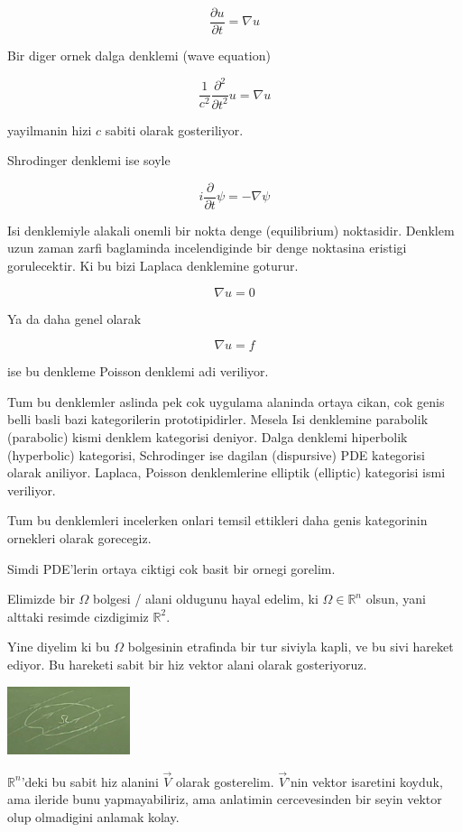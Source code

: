\documentclass[12pt,fleqn]{article}\usepackage{../common}
\begin{document}
\[ \frac{\partial u}{\partial t} = 
\nabla  u
\]

Bir diger ornek dalga denklemi (wave equation)

\[ \frac{1}{c^2} \frac{\partial ^2}{\partial t^2}u = \nabla u\]

yayilmanin hizi $c$ sabiti olarak gosteriliyor. 

Shrodinger denklemi ise soyle

\[ i \frac{\partial }{\partial t}\psi  = -\nabla \psi \]

Isi denklemiyle alakali onemli bir nokta denge (equilibrium)
noktasidir. Denklem uzun zaman zarfi baglaminda incelendiginde bir denge
noktasina eristigi gorulecektir. Ki bu bizi Laplaca denklemine goturur. 

\[ \nabla u = 0 \]

Ya da daha genel olarak 

\[ \nabla u = f \]

ise bu denkleme Poisson denklemi adi veriliyor. 

Tum bu denklemler aslinda pek cok uygulama alaninda ortaya cikan, cok genis
belli basli bazi kategorilerin prototipidirler. Mesela Isi denklemine
parabolik (parabolic) kismi denklem kategorisi deniyor. Dalga denklemi
hiperbolik (hyperbolic) kategorisi, Schrodinger ise dagilan (dispursive)
PDE kategorisi olarak aniliyor. Laplaca, Poisson denklemlerine elliptik
(elliptic) kategorisi ismi veriliyor. 

Tum bu denklemleri incelerken onlari temsil ettikleri daha genis
kategorinin ornekleri olarak gorecegiz. 

Simdi PDE'lerin ortaya ciktigi cok basit bir ornegi gorelim. 

Elimizde bir $\Omega$ bolgesi / alani oldugunu hayal edelim, ki $\Omega \in
\mathbb{R}^n$ olsun, 
yani alttaki resimde cizdigimiz $\mathbb{R}^2$.

Yine diyelim ki bu $\Omega$ bolgesinin etrafinda bir tur siviyla kapli, ve
bu sivi hareket ediyor. Bu hareketi sabit bir hiz vektor alani olarak
gosteriyoruz. 

\includegraphics[height=2cm]{1_1.png}

$\mathbb{R}^n$'deki bu sabit hiz alanini $\vec{V}$ olarak gosterelim. $\vec{V}$'nin vektor isaretini 
koyduk, ama ileride bunu yapmayabiliriz, ama anlatimin cercevesinden bir
seyin  vektor olup olmadigini anlamak kolay. 
\end{document}
